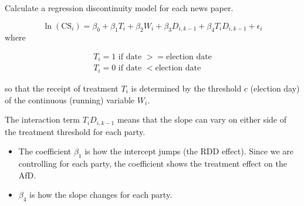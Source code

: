 \documentclass[
]{article}
\providecommand{\tightlist}{%
  \setlength{\itemsep}{0pt}\setlength{\parskip}{0pt}}
\begin{document}
Calculate a regression discontinuity model for each news paper.

\[
\ln(\text{CS}_{i})=\beta_0+\beta_1T_i+\beta_2W_{i}+\beta_3D_{i,k-1}+\beta_4T_iD_{i,k-1}+\epsilon_i
\] where

\[\begin{aligned}
T_i = 1 \text{ if date } >= \text{election date} \\
T_i = 0 \text{ if date } < \text{election date}
\end{aligned}\]

so that the receipt of treatment \(T_i\) is determined by the threshold
\(c\) (election day) of the continuous (running) variable \(W_i\).

The interaction term \(T_iD_{i,k-1}\) means that the slope can vary on
either side of the treatment threshold for each party.

\begin{itemize}
\tightlist
\item
  The coefficient \(\beta_1\) is how the intercept jumps (the RDD
  effect). Since we are controlling for each party, the coefficient
  shows the treatment effect on the AfD.
\item
  \(\beta_4\) is how the slope changes for each party.
\end{itemize}
\end{document}
